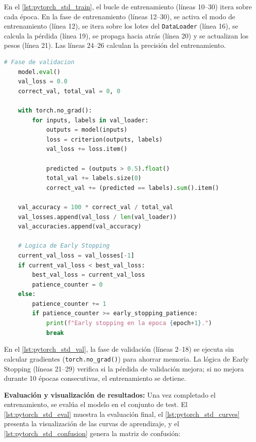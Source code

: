 En el \autoref{lst:pytorch_std_train}, el bucle de entrenamiento (líneas 10--30) itera sobre cada época. En la fase de entrenamiento (líneas 12--30), se activa el modo de entrenamiento (línea 12), se itera sobre los lotes del \texttt{DataLoader} (línea 16), se calcula la pérdida (línea 19), se propaga hacia atrás (línea 20) y se actualizan los pesos (línea 21). Las líneas 24--26 calculan la precisión del entrenamiento.

\begin{lstlisting}[language=Python, caption={Fase de validación y lógica de Early Stopping.}, label={lst:pytorch_std_val}]
    # Fase de validacion
    model.eval()
    val_loss = 0.0
    correct_val, total_val = 0, 0
    
    with torch.no_grad():
        for inputs, labels in val_loader:
            outputs = model(inputs)
            loss = criterion(outputs, labels)
            val_loss += loss.item()
            
            predicted = (outputs > 0.5).float()
            total_val += labels.size(0)
            correct_val += (predicted == labels).sum().item()

    val_accuracy = 100 * correct_val / total_val
    val_losses.append(val_loss / len(val_loader))
    val_accuracies.append(val_accuracy)

    # Logica de Early Stopping
    current_val_loss = val_losses[-1]
    if current_val_loss < best_val_loss:
        best_val_loss = current_val_loss
        patience_counter = 0
    else:
        patience_counter += 1
        if patience_counter >= early_stopping_patience:
            print(f"Early stopping en la epoca {epoch+1}.")
            break
\end{lstlisting}

En el \autoref{lst:pytorch_std_val}, la fase de validación (líneas 2--18) se ejecuta sin calcular gradientes (\texttt{torch.no\_grad()}) para ahorrar memoria. La lógica de Early Stopping (líneas 21--29) verifica si la pérdida de validación mejora; si no mejora durante 10 épocas consecutivas, el entrenamiento se detiene. %

\textbf{Evaluación y visualización de resultados:} Una vez completado el entrenamiento, se evalúa el modelo en el conjunto de test. El \autoref{lst:pytorch_std_eval} muestra la evaluación final, el \autoref{lst:pytorch_std_curves} presenta la visualización de las curvas de aprendizaje, y el \autoref{lst:pytorch_std_confusion} genera la matriz de confusión:

